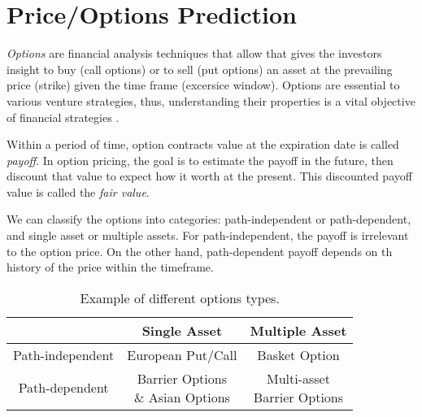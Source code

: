 \section{Price/Options Prediction} \label{Sec: Price Prediction}
\emph{Options} are financial analysis techniques that allow that gives the investors insight to buy (call options) or to sell (put options) an asset at the prevailing price (strike) given the time frame (excersice window).
Options are essential to various venture strategies, thus, understanding their properties is a vital objective of financial strategies \cite{kariyaOptionsFuturesOther2003}.

Within a period of time, option contracts value at the expiration date is called \emph{payoff}.
In option pricing, the goal is to estimate the payoff in the future, then discount that value to expect how it worth at the present.
This discounted payoff value is called the \emph{fair value}.

We can classify the options into categories: path-independent or path-dependent, and single asset or multiple assets.
For path-independent, the payoff is irrelevant to the option price.
On the other hand, path-dependent payoff depends on th history of the price within the timeframe.

\begin{table*}
    \centering
    \begin{tabular}{||c c c||}
        \hline
                         & Single Asset              & Multiple Asset \\
        \hline\hline
        Path-independent & European Put/Call         & Basket Option  \\
        Path-dependent   & \makecell{Barrier Options                  \\ \& Asian Options} & \makecell{Multi-asset \\ Barrier Options} \\
        \hline
    \end{tabular}
    \caption{Example of different options types.}
    \label{Tab: Option types}
\end{table*}